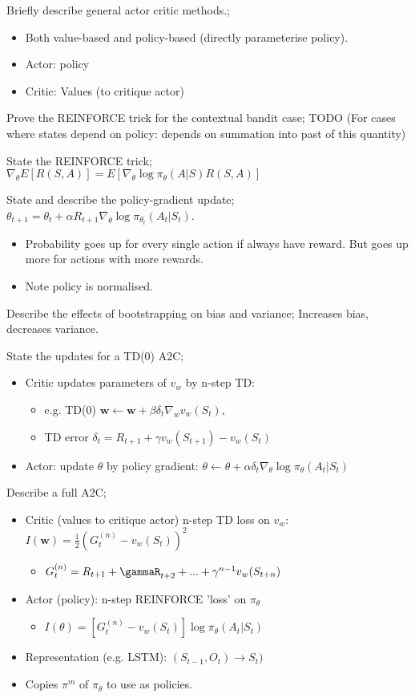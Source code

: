 \documentclass{article}
\begin{document}
Briefly describe general actor critic methods.; \begin{itemize} \item Both value-based and policy-based (directly parameterise policy). \item Actor: policy \item Critic: Values (to critique actor) \end{itemize}

Prove the REINFORCE trick for the contextual bandit case; TODO (For cases where states depend on policy: depends on summation into past of this quantity)

State the REINFORCE trick; $\nabla_\theta E[R(S,A)]=E[\nabla_\theta\log\pi_{\theta}(A|S)R(S,A)]$

State and describe the policy-gradient update; $\theta_{t+1}=\theta_t + \alpha R_{t+1}\nabla_\theta\log\pi_{\theta_t}(A_t|S_t)$. \begin{itemize} \item Probability goes up for every single action if always have reward. But goes up more for actions with more rewards. \item Note policy is normalised. \end{itemize}

Describe the effects of bootstrapping on bias and variance; Increases bias, decreases variance.

State the updates for a TD(0) A2C; \begin{itemize} \item Critic updates parameters of $v_w$ by n-step TD: \begin{itemize} \item e.g. TD(0) $\mathbf{w}\leftarrow\mathbf{w}+\beta\delta_t\nabla_wv_w(S_t)$, \item TD error $\delta_t=R_{t+1}+\gamma v_w(S_{t+1}) - v_w(S_t)$ \end{itemize}  \item Actor: update $\theta$ by policy gradient: $\theta \leftarrow \theta + \alpha\delta_t\nabla_\theta \log \pi_\theta (A_t|S_t)$ \end{itemize}

Describe a full A2C; \begin{itemize} \item Critic (values to critique actor) n-step TD loss on $v_w$: $I(\mathbf{w}) = \frac{1}{2}(G_t^{(n)}-v_w(S_t))^2$ \begin{itemize} \item $G_t^{(n)}=R_{t+1}+\gammaR_{t+2}+...+\gamma^{n-1}v_w(S_{t+n})$ \end{itemize} \item Actor (policy): n-step REINFORCE 'loss' on $\pi_\theta$ \begin{itemize} \item $I(\theta) = [G_t^{(n)} - v_w(S_t)]\log\pi_{\theta}(A_t|S_t)$ \end{itemize} \item Representation (e.g. LSTM): $(S_{t-1}, O_t) \rightarrow S_t)$ \item Copies $\pi^m$ of $\pi_\theta$ to use as policies. \end{itemize}
\end{document}
